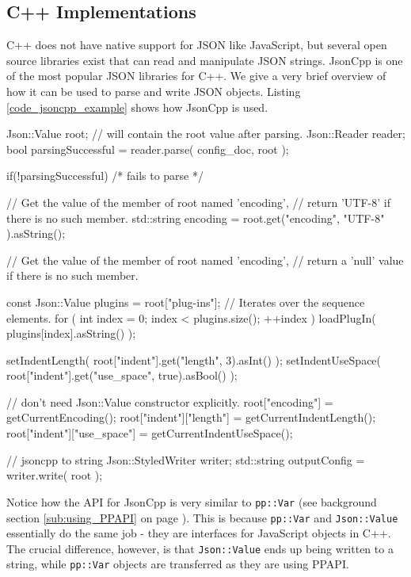 \subsection{C++ Implementations} %
\label{sub:jsonrpc_c_implementations}
C++ does not have native support for JSON like JavaScript, but several open source libraries exist that can read and  manipulate JSON strings. JsonCpp is one of the most popular JSON libraries for C++. We give a very brief overview of how it can be used to parse and write JSON objects. Listing \ref{code_jsoncpp_example} shows how JsonCpp is used.

\begin{code}
Json::Value root;   // will contain the root value after parsing.
Json::Reader reader;
bool parsingSuccessful = reader.parse( config_doc, root );

if(!parsingSuccessful){ /* fails to parse */ }

// Get the value of the member of root named 'encoding', 
// return 'UTF-8' if there is no such member.
std::string encoding = root.get("encoding", "UTF-8" ).asString();

// Get the value of the member of root named 'encoding', 
// return a 'null' value if there is no such member.

const Json::Value plugins = root["plug-ins"];
// Iterates over the sequence elements.
for ( int index = 0; index < plugins.size(); ++index )  
   loadPlugIn( plugins[index].asString() );
   
setIndentLength( root["indent"].get("length", 3).asInt() );
setIndentUseSpace( root["indent"].get("use_space", true).asBool() );

// don't need Json::Value constructor explicitly.
root["encoding"] = getCurrentEncoding();
root["indent"]["length"] = getCurrentIndentLength();
root["indent"]["use_space"] = getCurrentIndentUseSpace();

// jsoncpp to string
Json::StyledWriter writer;
std::string outputConfig = writer.write( root );
\end{code}

Notice how the API for JsonCpp is very similar to \lstinline{pp::Var} (see background section \ref{sub:using_PPAPI} on page \pageref{sub:using_PPAPI}). This is because \lstinline{pp::Var} and \lstinline{Json::Value} essentially do the same job - they are interfaces for JavaScript objects in C++. The crucial difference, however, is that \lstinline{Json::Value} ends up being written to a string, while \lstinline{pp::Var} objects are transferred as they are using PPAPI.

